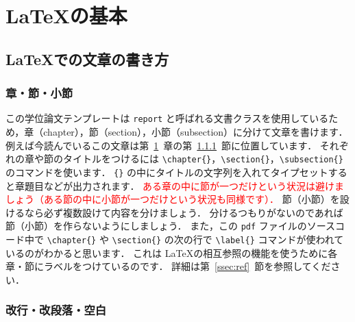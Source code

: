 \chapter{\LaTeX の基本}
\label{ch:basic}


\section{\LaTeX での文章の書き方}
\label{sec:sentence_in_LaTeX}

\subsection{章・節・小節}
\label{ssec:ch_sec_ssec}

この学位論文テンプレートは \verb|report| と呼ばれる文書クラスを使用しているため，章（chapter），節（section），小節（subsection）に分けて文章を書けます．
例えば今読んでいるこの文章は第~\ref{ch:basic}~章の第~\ref{ssec:ch_sec_ssec}~節に位置しています．
それぞれの章や節のタイトルをつけるには \verb|\chapter{}|，\verb|\section{}|，\verb|\subsection{}| のコマンドを使います．
\verb|{}| の中にタイトルの文字列を入れてタイプセットすると章題目などが出力されます．
\textcolor{red}{ある章の中に節が一つだけという状況は避けましょう（ある節の中に小節が一つだけという状況も同様です）．}
節（小節）を設けるなら必ず複数設けて内容を分けましょう．
分けるつもりがないのであれば節（小節）を作らないようにしましょう．
また，この \verb|pdf| ファイルのソースコード中で \verb|\chapter{}| や \verb|\section{}| の次の行で \verb|\label{}| コマンドが使われているのがわかると思います．
これは \LaTeX の相互参照の機能を使うために各章・節にラベルをつけているのです．
詳細は第~\ref{ssec:ref}~節を参照してください．

\subsection{改行・改段落・空白}
\label{ssec:space}

